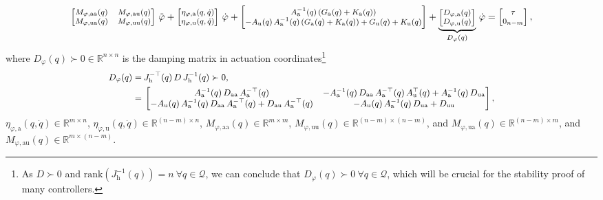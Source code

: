 \begin{equation}\footnotesize
    \begin{bmatrix}
        M_{\varphi,\mathrm{aa}}(q) & M_{\varphi,\mathrm{au}}(q)\\ 
        M_{\varphi,\mathrm{ua}}(q) & M_{\varphi,\mathrm{uu}}(q)
    \end{bmatrix} \, \ddot{\varphi} + \begin{bmatrix}
        \eta_{\varphi,\mathrm{a}}(q,\dot{q})\\ \eta_{\varphi,\mathrm{u}}(q,\dot{q})
    \end{bmatrix} \, \dot{\varphi} + \begin{bmatrix}
        A_\mathrm{a}^{-1}(q) \left ( G_\mathrm{a}(q) + K_\mathrm{a}(q) \right )\\
        -A_\mathrm{u}(q) \, A_\mathrm{a}^{-1}(q) \left ( G_\mathrm{a}(q) + K_\mathrm{a}(q) \right ) + G_\mathrm{u}(q) + K_\mathrm{u}(q)
    \end{bmatrix} + \underbrace{\begin{bmatrix}
        D_{\varphi,\mathrm{a}}(q)\\
        D_{\varphi,\mathrm{u}}(q)
    \end{bmatrix}}_{D_\varphi(q)} \, \dot{\varphi} = \begin{bmatrix}
        \tau\\ 0_{n-m}
    \end{bmatrix},
\end{equation}
where $D_{\varphi}(q) \succ 0 \in \mathbb{R}^{n \times n}$ is the damping matrix in actuation coordinates\footnote{As $D \succ 0$ and $\mathrm{rank}(J_\mathrm{h}^{-1}(q)) = n \: \forall q \in \mathcal{Q} $, we can conclude that $D_{\varphi}(q) \succ 0 \: \forall q \in \mathcal{Q}$, which will be crucial for the stability proof of many controllers.}
\begin{equation}\small
\begin{split}
    D_{\varphi}(q) =& \: J_\mathrm{h}^{-\top}(q) \, D \, J_\mathrm{h}^{-1}(q) \succ 0,\\
    =& \:  \begin{bmatrix}
         A_\mathrm{a}^{-1}(q) \, D_\mathrm{aa} \, A_\mathrm{a}^{-\top}(q) & -A_\mathrm{a}^{-1}(q) \, D_\mathrm{aa} \, A_\mathrm{a}^{-\top}(q) \, A_\mathrm{u}^\top(q) + A_\mathrm{a}^{-1}(q) \,  D_\mathrm{ua}\\
         -A_\mathrm{u}(q) \, A_\mathrm{a}^{-1}(q) \, D_\mathrm{aa} \, A_\mathrm{a}^{-\top}(q) + D_\mathrm{au} \, A_\mathrm{a}^{-\top}(q) & -A_\mathrm{u}(q) \, A_\mathrm{a}^{-1}(q) \, D_\mathrm{ua} + D_\mathrm{uu}
    \end{bmatrix},
\end{split}
\end{equation}
$\eta_{\varphi,\mathrm{a}}(q,\dot{q}) \in \mathbb{R}^{m \times n}$, $\eta_{\varphi,\mathrm{u}}(q,\dot{q}) \in \mathbb{R}^{(n-m) \times n}$, $M_{\varphi,\mathrm{aa}}(q) \in \mathbb{R}^{m \times m}$, $M_{\varphi,\mathrm{uu}}(q) \in \mathbb{R}^{(n-m) \times (n-m)}$, and $M_{\varphi,\mathrm{ua}}(q) \in \mathbb{R}^{(n-m) \times m}$, and $M_{\varphi,\mathrm{au}}(q) \in \mathbb{R}^{m \times (n-m)}$.

